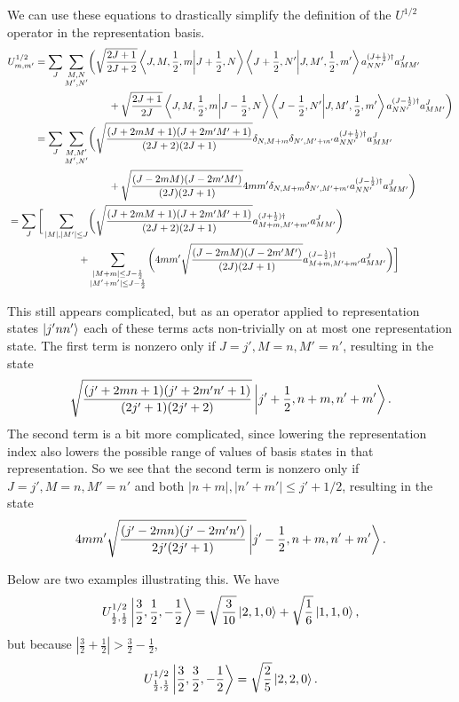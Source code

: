 \documentclass[10pt,reqno]{amsart}
\numberwithin{equation}{section}
\begin{document}
	We can use these equations to drastically simplify the definition of the $U^{1/2}$ operator in the representation basis.
	\begin{align*}
		U^{1/2}_{m,m'}=\sum_{J} \sum_{\substack{M,N\\M',N'}}  &\bigg( \sqrt{\frac{2J+1}{2J+2}}\braket{J,M,\frac{1}{2},m}{J+\frac{1}{2},N}\braket{J+\frac{1}{2},N'}{J,M',\frac{1}{2},m'}a^{(J+\frac{1}{2})\dagger}_{NN'}a^J_{MM'} \\
		&\qquad+\sqrt{\frac{2J+1}{2J}}\braket{J,M,\frac{1}{2},m}{J-\frac{1}{2},N}\braket{J-\frac{1}{2},N'}{J,M',\frac{1}{2},m'}a^{(J-\frac{1}{2})\dagger}_{NN'}a^J_{MM'} \bigg) \\
		=\sum_{J} \sum_{\substack{M,M'\\M',N'}} &\bigg( \sqrt{\frac{(J+2mM+1)(J+2m'M'+1)}{(2J+2)(2J+1)}}\delta_{N,M+m}\delta_{N',M'+m'} a^{(J+\frac{1}{2})\dagger}_{NN'}a^J_{MM'} \\
		&\qquad+\sqrt{\frac{(J-2mM)(J-2m'M')}{(2J)(2J+1)}}4mm'\delta_{N,M+m}\delta_{N',M'+m'}a^{(J-\frac{1}{2})\dagger}_{NN'}a^J_{MM'} \bigg) \\
		=\sum_{J} \bigg[\sum_{|M|,|M'|\leq J} &\bigg( \sqrt{\frac{(J+2mM+1)(J+2m'M'+1)}{(2J+2)(2J+1)}} a^{(J+\frac{1}{2})\dagger}_{M+m,M'+m'}a^J_{MM'}\bigg) \\
		+&\sum_{\substack{|M+m|\leq J-\frac{1}{2}\\|M'+m'|\leq J-\frac{1}{2}}} \bigg(4mm'\sqrt{\frac{(J-2mM)(J-2m'M')}{(2J)(2J+1)}}a^{(J-\frac{1}{2})\dagger}_{M+m,M'+m'}a^J_{MM'} \bigg)\bigg] \\
	\end{align*}
	
	This still appears complicated, but as an operator applied to representation states $\ket{j'nn'}$ each of these terms acts non-trivially on at most one representation state.
	The first term is nonzero only if $J=j',M=n,M'=n'$, resulting in the state
		\[ \sqrt{\frac{(j'+2mn+1)(j'+2m'n'+1)}{(2j'+1)(2j'+2)}} \ket{j'+\frac{1}{2},n+m,n'+m'}.\]
	The second term is a bit more complicated, since lowering the representation index also lowers the possible range of values of basis states in that representation.
	So we see that the second term is nonzero only if $J=j',M=n,M'=n'$ and both $|n+m|,|n'+m'|\leq j'+1/2$, resulting in the state
		\[ 4mm' \sqrt{\frac{(j'-2mn)(j'-2m'n')}{2j'(2j'+1)}} \ket{j'-\frac{1}{2},n+m,n'+m'}. \]
	
	Below are two examples illustrating this.
	We have 
		\[U^{1/2}_{\frac{1}{2},\frac{1}{2}} \ket{\frac{3}{2},\frac{1}{2},-\frac{1}{2}} = \sqrt{\frac{3}{10}}\ket{2,1,0}+\sqrt{\frac{1}{6}}\ket{1,1,0}, \]
	but because $|\frac{3}{2}+\frac{1}{2}| > \frac{3}{2}-\frac{1}{2}$,
		\[ U^{1/2}_{\frac{1}{2},\frac{1}{2}} \ket{\frac{3}{2},\frac{3}{2},-\frac{1}{2}} = \sqrt{\frac{2}{5}}\ket{2,2,0}. \]
	\vspace{0.4cm}
	
\end{document}
